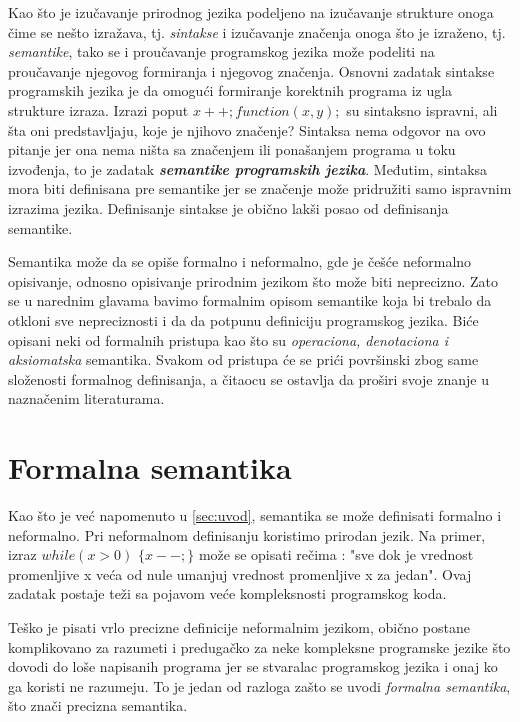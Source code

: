 \documentclass[a4paper]{article}
\begin{document}
{ Kao što je izučavanje prirodnog jezika podeljeno  na izučavanje strukture onoga čime se nešto izražava, tj. \textit{sintakse} i izučavanje značenja onoga što je izraženo, tj. \textit{semantike}, tako se i proučavanje programskog jezika može podeliti na proučavanje njegovog formiranja i njegovog značenja. Osnovni zadatak sintakse programskih jezika je da omogući formiranje korektnih programa iz ugla strukture izraza. Izrazi poput $ x++; function(x,y); $ su sintaksno ispravni, ali šta oni predstavljaju, koje je njihovo značenje? Sintaksa nema odgovor na ovo pitanje jer ona nema ništa sa značenjem ili ponašanjem programa u toku izvođenja, to je zadatak \textit{\textbf{semantike programskih jezika}}. Međutim, sintaksa mora biti definisana pre semantike jer se značenje može pridružiti samo ispravnim izrazima jezika. Definisanje sintakse je obično lakši posao od definisanja semantike.

	Semantika može da se opiše formalno i neformalno, gde je češće neformalno opisivanje, odnosno opisivanje prirodnim jezikom što može biti neprecizno. Zato se u narednim glavama bavimo formalnim opisom semantike koja bi trebalo da otkloni sve nepreciznosti i da da potpunu definiciju programskog jezika. Biće opisani neki od formalnih pristupa kao što su \textit{operaciona, denotaciona i aksiomatska} semantika. Svakom od pristupa će se prići površinski zbog same složenosti formalnog definisanja, a čitaocu se ostavlja da proširi svoje znanje u naznačenim literaturama.



\section{Formalna semantika}
\label{sec:forsem}

\qquad Kao što je već napomenuto u \ref{sec:uvod}, semantika se može definisati formalno i neformalno. Pri neformalnom definisanju koristimo prirodan jezik. Na primer, izraz $ while(x > 0)$  $\lbrace x--;\rbrace$ može se opisati rečima : "sve dok je vrednost promenljive x veća od nule umanjuj vrednost promenljive x za jedan". Ovaj zadatak postaje teži sa pojavom veće kompleksnosti programskog koda.

Teško je pisati vrlo precizne definicije neformalnim jezikom, obično postane komplikovano za razumeti i predugačko za neke kompleksne programske jezike što dovodi do loše napisanih programa jer se stvaralac programskog jezika i onaj ko ga koristi ne razumeju. To je jedan od razloga zašto se uvodi \textit{formalna semantika}, što znači precizna semantika.

}
\end{document}
